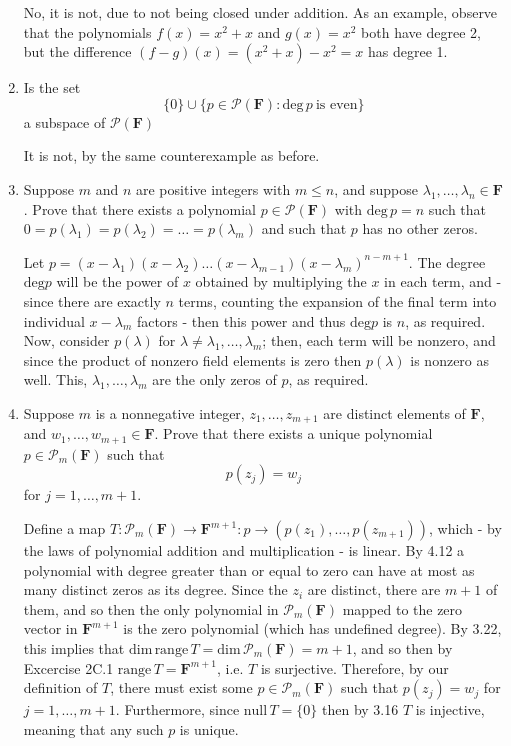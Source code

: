 \documentclass{book}
\begin{document}
\begin{enumerate}
No, it is not, due to not being closed under addition.  As an example, observe that the polynomials \(f(x)=x^2+x\) and \(g(x)=x^2\) both have degree 2, but the difference \((f-g)(x)=(x^2+x)-x^2=x\) has degree 1.

\item Is the set \[\{0\} \cup \{p \in \mathcal{P}(\textbf{F}): \textrm{deg} \, p \ \textrm{is even}\}\] a subspace of \(\mathcal{P}(\textbf{F})\)

It is not, by the same counterexample as before.

\item Suppose \(m\) and \(n\) are positive integers with \(m \leq n\), and suppose \(\lambda_1,\dots,\lambda_n \in \textbf{F}\).  Prove that there exists a polynomial \(p \in \mathcal{P}(\textbf{F})\) with \(\textrm{deg} \, p = n\) such that \(0 = p(\lambda_1) = p(\lambda_2)= \dots = p(\lambda_m)\) and such that \(p\) has no other zeros.

Let \(p = (x-\lambda_1)(x-\lambda_2)\dots(x-\lambda_{m-1})(x-\lambda_m)^{n-m+1}\).  The degree \(\textrm{deg} p\) will be the power of \(x\) obtained by multiplying the \(x\) in each term, and - since there are exactly \(n\) terms, counting the expansion of the final term into individual \(x-\lambda_m\) factors - then this power and thus \(\textrm{deg} p\) is \(n\), as required.  Now, consider \(p(\lambda)\) for \(\lambda \neq \lambda_1,\dots,\lambda_m\); then, each term will be nonzero, and since the product of nonzero field elements is zero then \(p(\lambda)\) is nonzero as well.  This, \(\lambda_1,\dots,\lambda_m\) are the only zeros of \(p\), as required.

\item Suppose \(m\) is a nonnegative integer, \(z_1,\dots,z_{m+1}\) are distinct elements of \(\textbf{F}\), and \(w_1,\dots,w_{m+1} \in \textbf{F}\).  Prove that there exists a unique polynomial \(p \in \mathcal{P}_m(\textbf{F})\) such that \[p(z_j)=w_j\] for \(j=1,\dots,m+1\).

Define a map \(T: \mathcal{P}_m(\textbf{F}) \rightarrow \textbf{F}^{m+1}: p \rightarrow (p(z_1),\dots,p(z_{m+1}))\), which - by the laws of polynomial addition and multiplication - is linear.  By 4.12 a polynomial with degree greater than or equal to zero can have at most as many distinct zeros as its degree.  Since the \(z_i\) are distinct, there are \(m+1\) of them, and so then the only polynomial in \(\mathcal{P}_m(\textbf{F})\) mapped to the zero vector in \(\textbf{F}^{m+1}\) is the zero polynomial (which has undefined degree).  By 3.22, this implies that \(\textrm{dim} \, \textrm{range} \, T = \textrm{dim} \, \mathcal{P}_m (\textbf{F}) = m+1\), and so then by Excercise 2C.1 \(\textrm{range} \, T = \textbf{F}^{m+1}\), i.e. \(T\) is surjective.  Therefore, by our definition of \(T\), there must exist some \(p \in \mathcal{P}_m(\textbf{F})\) such that \(p(z_j)=w_j\) for \(j=1,\dots,m+1\).  Furthermore, since \(\textrm{null} \, T = \{0\}\) then by 3.16 \(T\) is injective, meaning that any such \(p\) is unique.


\end{enumerate}
\end{document}
